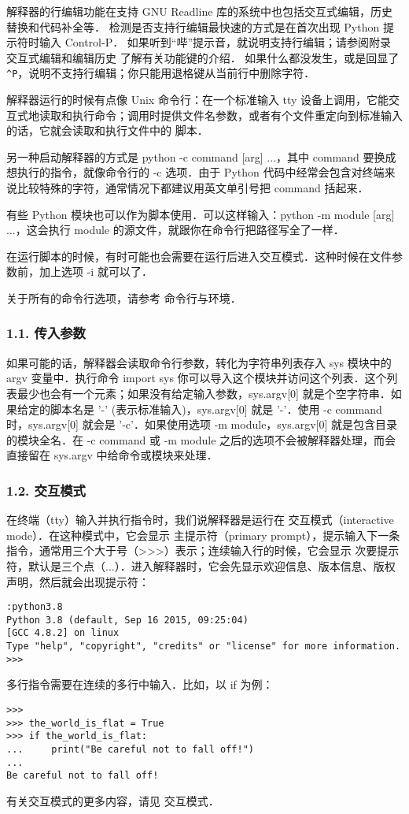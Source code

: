 解释器的行编辑功能在支持 GNU Readline 库的系统中也包括交互式编辑，历史替换和代码补全等． 检测是否支持行编辑最快速的方式是在首次出现 Python 提示符时输入 Control-P． 如果听到“哔”提示音，就说明支持行编辑；请参阅附录 交互式编辑和编辑历史 了解有关功能键的介绍． 如果什么都没发生，或是回显了 \verb|^P|，说明不支持行编辑；你只能用退格键从当前行中删除字符．

解释器运行的时候有点像 Unix 命令行：在一个标准输入 tty 设备上调用，它能交互式地读取和执行命令；调用时提供文件名参数，或者有个文件重定向到标准输入的话，它就会读取和执行文件中的 脚本．

另一种启动解释器的方式是 python -c command [arg] ...，其中 command 要换成想执行的指令，就像命令行的 -c 选项．由于 Python 代码中经常会包含对终端来说比较特殊的字符，通常情况下都建议用英文单引号把 command 括起来．

有些 Python 模块也可以作为脚本使用．可以这样输入：python -m module [arg] ...，这会执行 module 的源文件，就跟你在命令行把路径写全了一样．

在运行脚本的时候，有时可能也会需要在运行后进入交互模式．这种时候在文件参数前，加上选项 -i 就可以了．

关于所有的命令行选项，请参考 命令行与环境．

\subsubsection{1.1. 传入参数}
如果可能的话，解释器会读取命令行参数，转化为字符串列表存入 sys 模块中的 argv 变量中．执行命令 import sys 你可以导入这个模块并访问这个列表．这个列表最少也会有一个元素；如果没有给定输入参数，sys.argv[0] 就是个空字符串．如果给定的脚本名是 '-' (表示标准输入)，sys.argv[0] 就是 '-'．使用 -c command 时，sys.argv[0] 就会是 '-c'．如果使用选项 -m module，sys.argv[0] 就是包含目录的模块全名．在 -c command 或 -m module 之后的选项不会被解释器处理，而会直接留在 sys.argv 中给命令或模块来处理．

\subsubsection{1.2. 交互模式}

在终端（tty）输入并执行指令时，我们说解释器是运行在 交互模式（interactive mode）．在这种模式中，它会显示 主提示符（primary prompt），提示输入下一条指令，通常用三个大于号（>>>）表示；连续输入行的时候，它会显示 次要提示符，默认是三个点（...）．进入解释器时，它会先显示欢迎信息、版本信息、版权声明，然后就会出现提示符：

\begin{lstlisting}[language=none]
:python3.8
Python 3.8 (default, Sep 16 2015, 09:25:04)
[GCC 4.8.2] on linux
Type "help", "copyright", "credits" or "license" for more information.
>>>
\end{lstlisting}
多行指令需要在连续的多行中输入．比如，以 if 为例：
\begin{lstlisting}[language=none]
>>>
>>> the_world_is_flat = True
>>> if the_world_is_flat:
...     print("Be careful not to fall off!")
...
Be careful not to fall off!
\end{lstlisting}
有关交互模式的更多内容，请见 交互模式．


